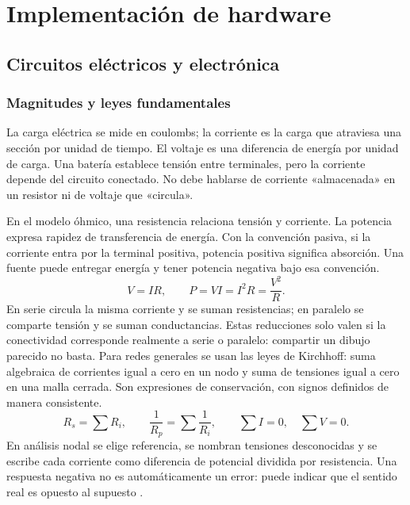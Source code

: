 \chapter{Implementación de hardware}
\section{Circuitos eléctricos y electrónica}\label{sec:h1}
\subsection{Magnitudes y leyes fundamentales}
La carga eléctrica se mide en coulombs; la corriente es la carga que atraviesa una sección por unidad de tiempo. El voltaje es una diferencia de energía por unidad de carga. Una batería establece tensión entre terminales, pero la corriente depende del circuito conectado. No debe hablarse de corriente «almacenada» en un resistor ni de voltaje que «circula».

En el modelo óhmico, una resistencia relaciona tensión y corriente. La potencia expresa rapidez de transferencia de energía. Con la convención pasiva, si la corriente entra por la terminal positiva, potencia positiva significa absorción. Una fuente puede entregar energía y tener potencia negativa bajo esa convención.
\begin{equation}
V=IR,\qquad P=VI=I^2R=\frac{V^2}{R}.
\end{equation}
En serie circula la misma corriente y se suman resistencias; en paralelo se comparte tensión y se suman conductancias. Estas reducciones solo valen si la conectividad corresponde realmente a serie o paralelo: compartir un dibujo parecido no basta. Para redes generales se usan las leyes de Kirchhoff: suma algebraica de corrientes igual a cero en un nodo y suma de tensiones igual a cero en una malla cerrada. Son expresiones de conservación, con signos definidos de manera consistente.
\begin{equation}
R_s=\sum R_i,\qquad \frac1{R_p}=\sum\frac1{R_i},\qquad
\sum I=0,\quad\sum V=0.
\end{equation}
En análisis nodal se elige referencia, se nombran tensiones desconocidas y se escribe cada corriente como diferencia de potencial dividida por resistencia. Una respuesta negativa no es automáticamente un error: puede indicar que el sentido real es opuesto al supuesto \cite[sección 10.3]{openstax}.

